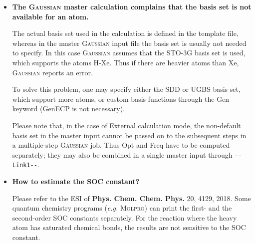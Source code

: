 \documentclass[UTF8]{article}
\begin{document}
\begin{itemize}
\item \textbf{The \textsc{Gaussian} master calculation complains that the basis set is not available for an atom.}

The actual basis set used in the calculation is defined in the template file, whereas in the master \textsc{Gaussian} input file
the basis set is usually not needed to specify. In this case \textsc{Gaussian} assumes that the \textsf{STO-3G} basis set is used,
which supports the atoms H-Xe. Thus if there are heavier atoms than Xe, \textsc{Gaussian} reports an error.

To solve this problem, one may specify either the \textsf{SDD} or \textsf{UGBS} basis set, which support more atoms,
or custom basis functions through the \textsf{Gen} keyword (\textsf{GenECP} is not necessary).

Please note that, in the case of \textsf{External} calculation mode, the non-default basis set in the master input
cannot be passed on to the subsequent steps in a multiple-step \textsc{Gaussian} job.
Thus \textsf{Opt} and \textsf{Freq} have to be computed separately; they may also be combined in a single master input
through \verb|--Link1--|.

\item \textbf{How to estimate the SOC constant?}

Please refer to the ESI of \textbf{Phys. Chem. Chem. Phys.} 20, 4129, 2018.
Some quantum chemistry programs (\textit{e.g.} \textsc{Molpro}) can print the first- and the second-order SOC constants separately.
For the reaction where the heavy atom has saturated chemical bonds, the results are not sensitive to the SOC constant.

\end{itemize}
\end{document}
